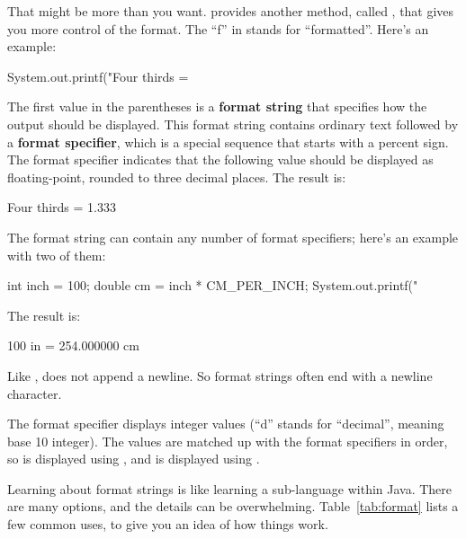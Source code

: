 
That might be more than you want.
 provides another method, called , that gives you more control of the format.
The ``f'' in  stands for ``formatted''.
Here's an example:

\begin{code}
System.out.printf("Four thirds = %
\end{code}


The first value in the parentheses is a {\bf format string} that specifies how the output should be displayed.
This format string contains ordinary text followed by a {\bf format specifier}, which is a special sequence that starts with a percent sign.
The format specifier  indicates that the following value should be displayed as floating-point, rounded to three decimal places.
The result is:

\begin{stdout}
Four thirds = 1.333
\end{stdout}

The format string can contain any number of format specifiers; here's an example with two of them:

\begin{code}
int inch = 100;
double cm = inch * CM_PER_INCH;
System.out.printf("%
\end{code}

The result is:

\begin{stdout}
100 in = 254.000000 cm
\end{stdout}

Like ,  does not append a newline.
So format strings often end with a newline character.

The format specifier  displays integer values (``d'' stands for ``decimal'', meaning base 10 integer).
The values are matched up with the format specifiers in order, so  is displayed using , and  is displayed using .

Learning about format strings is like learning a sub-language within Java.
There are many options, and the details can be overwhelming.
Table~\ref{tab:format} lists a few common uses, to give you an idea of how things work.


